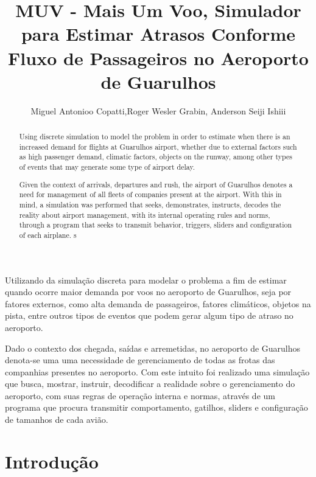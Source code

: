 \documentclass[12pt]{article}
\title{MUV - Mais Um Voo, Simulador para Estimar Atrasos Conforme Fluxo de
  Passageiros no Aeroporto de Guarulhos}
\author{Miguel Antonioo Copatti\inst{1},Roger Wesler Grabin\inst{2}, Anderson Seiji Ishiii\inst{3}}
\begin{document}
 

\maketitle

\begin{abstract}
  Using discrete simulation to model the problem in order to estimate when there is
  an increased demand for flights at Guarulhos airport, whether due to external
  factors such as high passenger demand, climatic factors, objects on the runway,
  among other types of events that may generate some type of airport delay.

  Given the context of arrivals, departures and rush, the airport of Guarulhos denotes 
  a need for management of all fleets of companies present at the airport.
  With this in mind, a simulation was performed that seeks, demonstrates,
  instructs, decodes the reality about airport management, with its internal operating
  rules and norms, through a program that seeks to transmit behavior, triggers, sliders
  and configuration of each airplane.
  s
\end{abstract}
     
\begin{resumo} 



  Utilizando da simulação discreta para modelar o problema a fim de estimar quando ocorre maior
  demanda por voos no aeroporto de Guarulhos, seja por fatores externos, como alta demanda de 
  passageiros, fatores climáticos, objetos na pista, entre outros tipos de eventos que podem 
  gerar algum tipo de atraso no aeroporto.

  Dado o contexto dos chegada, saídas e arremetidas, no aeroporto de Guarulhos denota-se uma
  uma necessidade de gerenciamento de todas as frotas das companhias presentes no aeroporto.
  Com este intuito foi realizado uma simulação que busca, mostrar, instruir, decodificar a
  realidade sobre o gerenciamento do aeroporto, com suas regras de operação interna e normas, 
  através de um programa que procura transmitir comportamento, gatilhos, sliders e configuração
  de tamanhos de cada avião.
 

\end{resumo}


\section{Introdução}
\end{document}
